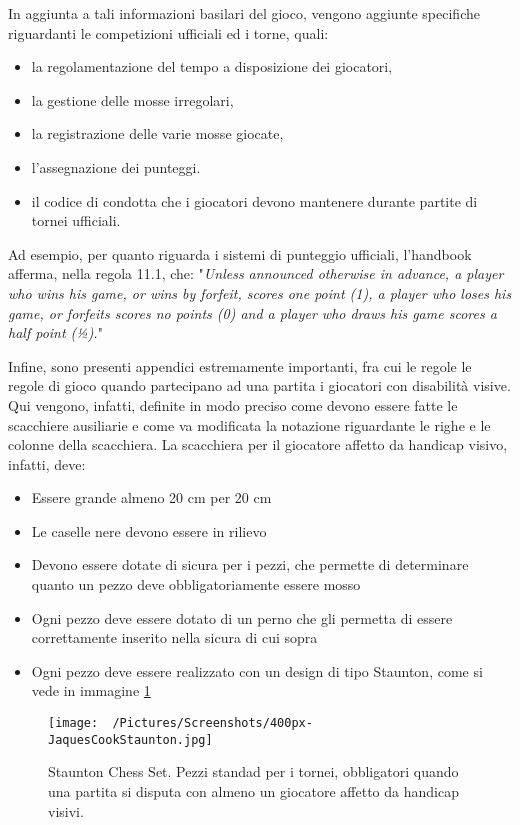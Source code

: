 \documentclass[12pt]{book}
\begin{document}
In aggiunta a tali informazioni basilari del gioco, vengono aggiunte
specifiche riguardanti le competizioni ufficiali ed i torne, quali:

\begin{itemize}
  \item la regolamentazione del tempo a disposizione dei
    giocatori, 
  \item la gestione delle mosse irregolari, 
  \item la registrazione delle varie mosse giocate, 
  \item l'assegnazione dei punteggi.
  \item il codice di condotta che i giocatori devono mantenere durante
    partite di tornei ufficiali.

\end{itemize}

Ad esempio, per quanto riguarda i sistemi di punteggio ufficiali,
l'handbook afferma, nella regola 11.1, che: "\textit{Unless announced otherwise in advance, a player who wins his game, or wins by forfeit,
scores one point (1), a player who loses his game, or forfeits scores no points (0) and a
player who draws his game scores a half point (½).}"

Infine, sono presenti appendici estremamente importanti, fra cui le
regole le regole di gioco quando partecipano ad una partita i giocatori con 
disabilità visive. Qui vengono,
infatti, definite in modo preciso come devono essere fatte le
scacchiere ausiliarie e come va modificata la notazione riguardante le
righe e le colonne della scacchiera. La scacchiera per il giocatore
affetto da handicap visivo, infatti, deve:

\begin{itemize}
  \item Essere grande almeno 20 cm per 20 cm
  \item Le caselle nere devono essere in rilievo
  \item Devono essere dotate di sicura per i pezzi, che permette di
    determinare quanto un pezzo deve obbligatoriamente essere mosso
  \item Ogni pezzo deve essere dotato di un perno che gli permetta di
    essere correttamente inserito nella sicura di cui sopra
  \item Ogni pezzo deve essere realizzato con un design di tipo
    Staunton, come si vede in immagine \ref{fig:pezzi_staunton}
\end{itemize}

\begin{figure}[h]
  \caption{Staunton Chess Set. Pezzi standad per i tornei, obbligatori
  quando una partita si disputa con almeno un giocatore affetto da handicap visivi.}
  \centering
  \label{fig:pezzi_staunton}
  \texttt{[image: ~/Pictures/Screenshots/400px-JaquesCookStaunton.jpg]}
\end{figure} 
\end{document}
